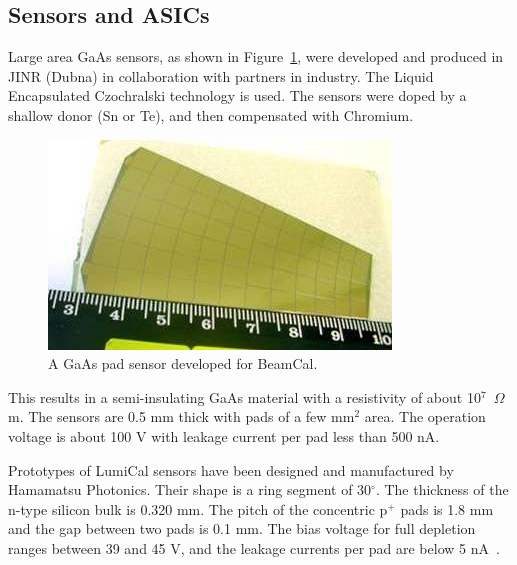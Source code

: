 \subsection{Sensors and ASICs}


Large area GaAs sensors, as shown in Figure~\ref{fig:GaAs}, were developed
and produced in JINR (Dubna) in collaboration with partners in industry. The Liquid Encapsulated
Czochralski technology is used. The sensors were
doped by a shallow donor (Sn or Te),
and then compensated  with Chromium.
\begin{figure}[hbp]
\begin{center}
    \includegraphics[width=0.8\columnwidth]{Calorimeter/FCAL/figs/GaAs_sensor_new.jpg}
  \end{center}
          \caption{A GaAs pad sensor developed for BeamCal.}
    \label{fig:GaAs}
\end{figure}
This results in a semi-insulating GaAs material with a resistivity of about 10$^7$~$\Omega$m.
The sensors are 0.5 mm thick with pads of a few mm$^2$ area. The operation voltage is about 100 V with
leakage current per pad less than 500 nA.

Prototypes of LumiCal sensors have been designed
and manufactured by Hamamatsu
Photonics.
Their shape is a ring segment of 30$^\circ$.
The thickness of the n-type silicon bulk is 0.320 mm.
The pitch of the concentric p$^+$ pads is 1.8 mm and
the gap between two pads is 0.1 mm.
The bias voltage for full depletion ranges between 39 and 45 V,
and the leakage currents per pad are below 5 nA~\cite{eudet2009}.

